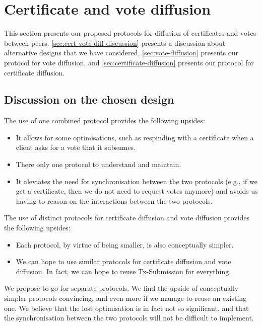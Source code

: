 \section{Certificate and vote diffusion}

This section presents our proposed protocols for diffusion of certificates and
votes between peers. \autoref{sec:cert-vote-diff-discussion} presents a
discussion about alternative designs that we have considered,
\autoref{sec:vote-diffusion} presents our protocol for vote diffusion, and
\autoref{sec:certificate-diffusion} presents our protocol for certificate
diffusion.

\subsection{Discussion on the chosen design}%
\label{sec:cert-vote-diff-discussion}


The use of one combined protocol provides the following upsides:
%
\begin{itemize}
\item It allows for some optimisations, such as respinding with a certificate
  when a client asks for a vote that it subsumes.

\item There only one protocol to understand and maintain.

\item It aleviates the need for synchronisation between the two protocols (e.g.,
  if we get a certificate, then we do not need to request votes anymore) and
  avoids us having to reason on the interactions between the two protocols.
\end{itemize}

The use of distinct protocols for certificate diffusion and vote diffusion
provides the following upsides:

\begin{itemize}
\item Each protocol, by virtue of being smaller, is also conceptually simpler.

\item We can hope to use similar protocols for certificate diffusion and vote
  diffusion. In fact, we can hope to reuse Tx-Submission for everything.
\end{itemize}

We propose to go for separate protocols. We find the upside of conceptually
simpler protocols convincing, and even more if we manage to reuse an existing
one. We believe that the lost optimisation is in fact not so significant, and
that the synchronisation between the two protocols will not be difficult to
implement.

